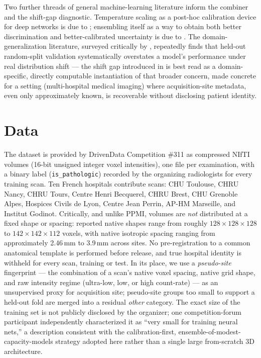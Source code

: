 \documentclass[11pt]{article}
\begin{document}
Two further threads of general machine-learning literature inform the combiner and the shift-gap diagnostic. Temperature scaling as a post-hoc calibration device for deep networks is due to \citet{guo2017}; ensembling itself as a way to obtain both better discrimination and better-calibrated uncertainty is due to \citet{lakshminarayanan2017}. The domain-generalization literature, surveyed critically by \citet{gulrajani2021}, repeatedly finds that held-out random-split validation systematically overstates a model's performance under real distribution shift --- the shift gap introduced in  is best read as a domain-specific, directly computable instantiation of that broader concern, made concrete for a setting (multi-hospital medical imaging) where acquisition-site metadata, even only approximately known, is recoverable without disclosing patient identity.

\section{Data}
\label{sec:data}

The dataset is provided by DrivenData Competition \#311 as compressed NIfTI volumes (16-bit unsigned integer voxel intensities), one file per examination, with a binary label (\texttt{is\_pathologic}) recorded by the organizing radiologists for every training scan. Ten French hospitals contribute scans: CHU Toulouse, CHRU Nancy, CHRU Tours, Centre Henri Becquerel, CHRU Brest, CHU Grenoble Alpes, Hospices Civils de Lyon, Centre Jean Perrin, AP-HM Marseille, and Institut Godinot. Critically, and unlike PPMI, volumes are \emph{not} distributed at a fixed shape or spacing: reported native shapes range from roughly $128\times128\times128$ to $142\times142\times112$ voxels, with native isotropic spacing ranging from approximately 2.46\,mm to 3.9\,mm across sites. No pre-registration to a common anatomical template is performed before release, and true hospital identity is withheld for every scan, training or test. In its place, we use a \emph{pseudo-site} fingerprint --- the combination of a scan's native voxel spacing, native grid shape, and raw intensity regime (ultra-low, low, or high count-rate) --- as an unsupervised proxy for acquisition site; pseudo-site groups too small to support a held-out fold are merged into a residual \emph{other} category. The exact size of the training set is not publicly disclosed by the organizer; one competition-forum participant independently characterized it as ``very small for training neural nets,'' a description consistent with the calibration-first, ensemble-of-modest-capacity-models strategy adopted here rather than a single large from-scratch 3D architecture.
\end{document}
